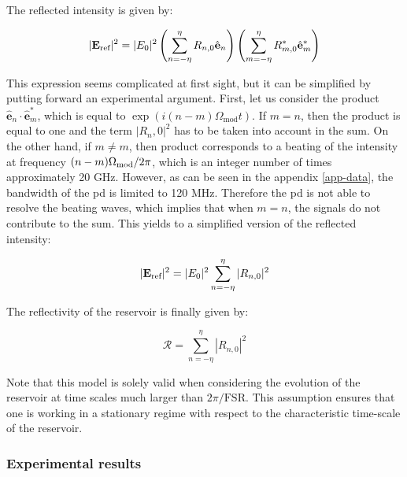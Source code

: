 The reflected intensity is given by:

\begin{equation}
	|\mathbf{E}_{\text{ref}}|^2 = |E_0|^2 \left(\sum_{n=-\eta}^\eta R_{n,0} \hat{\mathbf{e}}_n \right) \left(\sum_{m=-\eta}^\eta R_{m,0}^* \hat{\mathbf{e}}_m^* \right)
\end{equation}

This expression seems complicated at first sight, but it can be simplified by putting forward an experimental argument. First, let us consider the product $\hat{\mathbf{e}}_n \cdot \hat{\mathbf{e}}_m^*$, which is equal to $\exp{(i(n-m)\Omega_{\text{mod}}t)}$. If $m=n$, then the product is equal to one and the term $|R_n,0|^2$ has to be taken into account in the sum. On the other hand, if $m\neq m$, then product corresponds to a beating of the intensity at frequency $(n-m)\Omega_{\text{mod}}/2\pi$, which is an integer number of times approximately 20 GHz. However, as can be seen in the appendix \ref{app-data}, the bandwidth of the \gls{pd} is limited to 120 MHz. Therefore the \gls{pd} is not able to resolve the beating waves, which implies that when $m=n$, the signals do not contribute to the sum. This yields to a simplified version of the reflected intensity:

\begin{equation}
	|\mathbf{E}_{\text{ref}}|^2 = |E_0|^2 \sum_{n=-\eta}^\eta |R_{n,0}|^2
\end{equation}

The reflectivity of the reservoir is finally given by:

\begin{equation}
	\mathcal{R} = \sum_{n=-\eta}^\eta |R_{n,0}|^2
\end{equation}

Note that this model is solely valid when considering the evolution of the reservoir at time scales much larger than $2\pi / \text{FSR}$. This assumption ensures that one is working in a stationary regime with respect to the characteristic time-scale of the reservoir.


\subsubsection{Experimental results}

